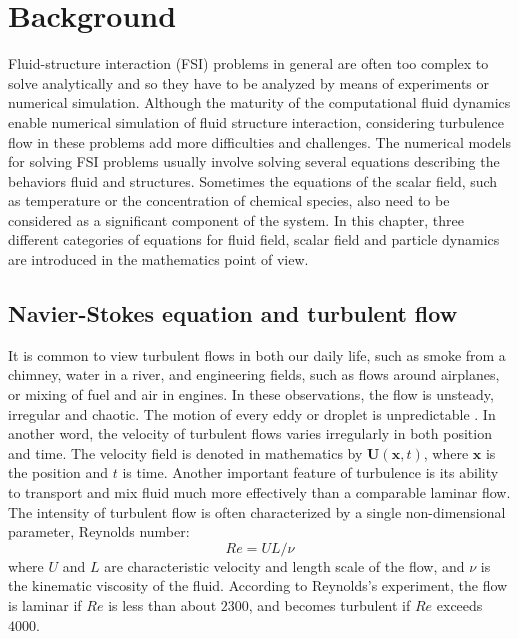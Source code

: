 \chapter{Background}\label{background}
Fluid-structure interaction (FSI) problems in general are often too complex to solve analytically and so they have to be analyzed by means of experiments or numerical simulation. Although the maturity of the computational fluid dynamics enable numerical simulation of fluid structure interaction, considering turbulence flow in these problems add more difficulties and challenges. The numerical models for solving FSI problems usually involve solving several equations describing the behaviors fluid and structures. Sometimes the equations of the scalar field, such as temperature or the concentration of chemical species, also need to be considered as a significant component of the system. In this chapter, three different categories of equations for fluid field, scalar field and particle dynamics are introduced in the mathematics point of view.

\section{Navier-Stokes equation and turbulent flow}
It is common to view turbulent flows in both our daily life, such as smoke from a chimney, water in a river, and engineering fields, such as flows around airplanes, or mixing of fuel and air in engines. In these observations, the flow is unsteady, irregular and chaotic. The motion of every eddy or droplet is unpredictable \cite{PopeTurbulent2000}. In another word, the velocity of turbulent flows varies irregularly in both position and time. The velocity field is denoted in mathematics by $\mathbf{U}(\mathbf{x},t)$, where $\mathbf{x}$ is the position and $t$ is time. Another important feature of turbulence is its ability to transport and mix fluid much more effectively than a comparable laminar flow. The intensity of turbulent flow is often characterized by a single non-dimensional parameter, Reynolds number\cite{Reynolds1894}: 
\begin{equation}
Re = U L / \nu
\label{ReynoldsNumber}
\end{equation}
where $U$ and $L$ are characteristic velocity and length scale of the flow, and $\nu$ is the kinematic viscosity of the fluid. According to Reynolds's experiment, the flow is laminar if $Re$ is less than about $2300$, and becomes turbulent if $Re$ exceeds $4000$.

